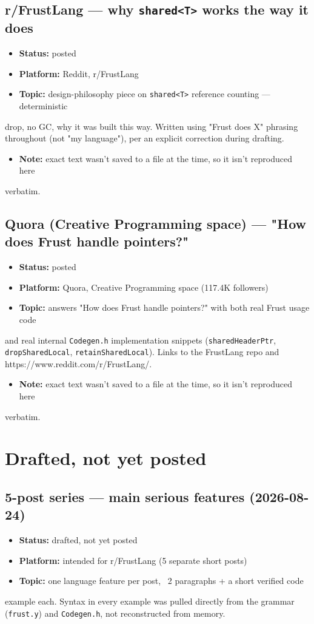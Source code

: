 \documentclass{book}
\begin{document}
\subsection{r/FrustLang — why \texttt{shared<T>} works the way it does}
\begin{itemize}
\item \textbf{Status:} posted
\item \textbf{Platform:} Reddit, r/FrustLang
\item \textbf{Topic:} design-philosophy piece on \texttt{shared<T>} reference counting — deterministic
\end{itemize}
  drop, no GC, why it was built this way. Written using "Frust does X" phrasing
  throughout (not "my language"), per an explicit correction during drafting.
\begin{itemize}
\item \textbf{Note:} exact text wasn't saved to a file at the time, so it isn't reproduced here
\end{itemize}
  verbatim.

\subsection{Quora (Creative Programming space) — "How does Frust handle pointers?"}
\begin{itemize}
\item \textbf{Status:} posted
\item \textbf{Platform:} Quora, Creative Programming space (117.4K followers)
\item \textbf{Topic:} answers "How does Frust handle pointers?" with both real Frust usage code
\end{itemize}
  and real internal \texttt{Codegen.h} implementation snippets (\texttt{sharedHeaderPtr},
  \texttt{dropSharedLocal}, \texttt{retainSharedLocal}). Links to the FrustLang repo and
  https://www.reddit.com/r/FrustLang/.
\begin{itemize}
\item \textbf{Note:} exact text wasn't saved to a file at the time, so it isn't reproduced here
\end{itemize}
  verbatim.

\section{Drafted, not yet posted}

\subsection{5-post series — main serious features (2026-08-24)}
\begin{itemize}
\item \textbf{Status:} drafted, not yet posted
\item \textbf{Platform:} intended for r/FrustLang (5 separate short posts)
\item \textbf{Topic:} one language feature per post, ~2 paragraphs + a short verified code
\end{itemize}
  example each. Syntax in every example was pulled directly from the grammar
  (\texttt{frust.y}) and \texttt{Codegen.h}, not reconstructed from memory.
\end{document}
